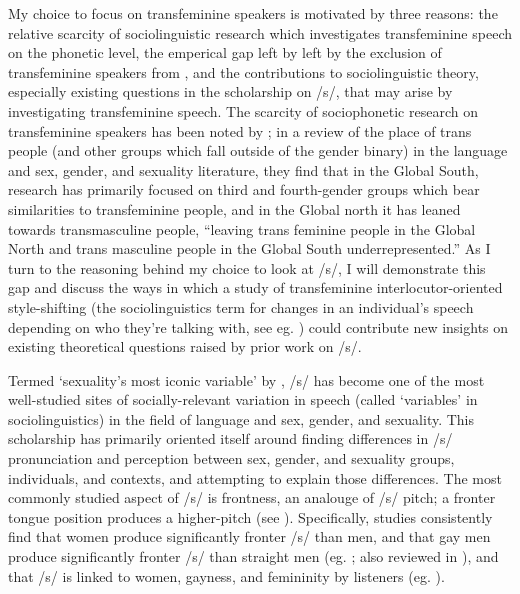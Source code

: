 \documentclass[11pt]{article}
\begin{document}
My choice to focus on transfeminine speakers is motivated by three reasons: the relative scarcity of sociolinguistic research which investigates transfeminine speech on the phonetic level, the emperical gap left by left by the exclusion of transfeminine speakers from \textcite{parnell-mooney_transgender_2019}, and the contributions to sociolinguistic theory, especially existing questions in the scholarship on /s/, that may arise by investigating transfeminine speech.  The scarcity of sociophonetic research on transfeminine speakers has been noted by \textcite{zimman_transgender_2020}; in a review of the place of trans people (and other groups which fall outside of the gender binary) in the language and sex, gender, and sexuality literature, they find that  in the Global South, research has primarily focused on third and fourth-gender groups  which bear similarities to transfeminine people, and in the Global north it has leaned towards transmasculine people, ``leaving trans feminine people in the Global North and trans masculine people in the Global South underrepresented.'' As I turn to the reasoning behind my choice to look at /s/, I will demonstrate this gap and discuss the ways in which a study of transfeminine interlocutor-oriented style-shifting (the sociolinguistics term for changes in an individual's speech depending on who they're talking with, see eg. \cite{rickford_addressee_1994}) could contribute new insights on existing theoretical questions raised by prior work on /s/.

Termed `sexuality's most iconic variable' by \textcite{calder_gay_2020}, /s/ has become one of the most well-studied sites of socially-relevant variation in speech (called `variables' in sociolinguistics) in the field of language and sex, gender, and sexuality. This scholarship has primarily oriented itself around finding differences in /s/ pronunciation and perception between sex, gender, and sexuality groups, individuals, and contexts, and attempting to explain those differences. The most commonly studied aspect of /s/ is frontness, an analouge of /s/ pitch; a fronter tongue position produces a higher-pitch (see \cite{fuchs_differences_2010}). Specifically, studies consistently find that women produce significantly fronter /s/ than men, and that gay men produce significantly fronter /s/ than straight men (eg. \cite{podesva_sexuality_2015, hazenberg_language_2012, flipsen_acoustic_1999}; also reviewed in \cite{calder_gay_2020}), and that /s/ is linked to women, gayness, and femininity by listeners (eg. \cite{campbell-kibler_intersecting_2011, maegaard_s_2015}).
\end{document}
